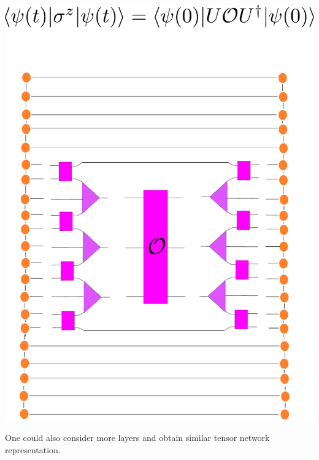 \documentclass[aps,prb,onecolumn,groupedaddress,notitlepage,showpacs,floatfix,superscriptaddress]{revtex4-1}
\begin{document}
\begin{center}
\includegraphics[scale=0.2, angle=0, origin=c]{Finaltimeoperator}
\end{center}
 
One could also consider more layers and obtain similar tensor network representation.  
        
        
 
 
\end{document}
